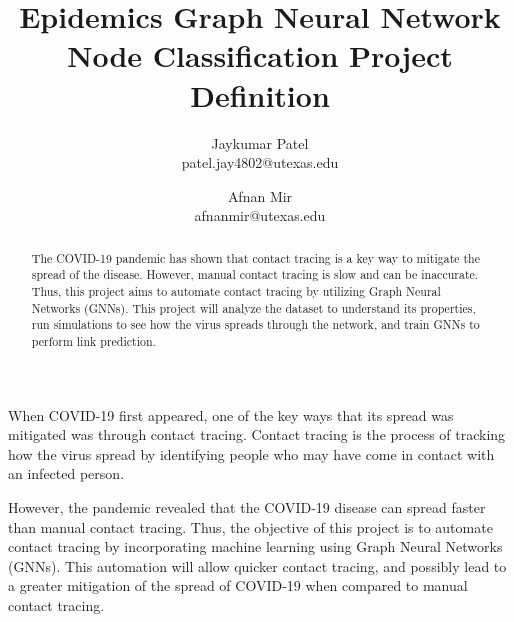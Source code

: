 \documentclass[times, 10pt,twocolumn]{article}
\begin{document}
\title{Epidemics Graph Neural Network Node Classification Project Definition}

\author{Jaykumar Patel\\
patel.jay4802@utexas.edu\\
\and
Afnan Mir\\
afnanmir@utexas.edu\\
}

\maketitle
\thispagestyle{empty}

\begin{abstract}
The COVID-19 pandemic has shown that contact tracing is a key way to mitigate the spread of the disease. However, manual contact tracing is slow and can be inaccurate. Thus, this project aims to automate contact tracing by utilizing Graph Neural Networks (GNNs). This project will analyze the dataset to understand its properties, run simulations to see how the virus spreads through the network, and train GNNs to perform link prediction.
\end{abstract}



When COVID-19 first appeared, one of the key ways that its spread was mitigated was through contact tracing. Contact tracing is the process of tracking how the virus spread by identifying people who may have come in contact with an infected person.

However, the pandemic revealed that the COVID-19 disease can spread faster than manual contact tracing. Thus, the objective of this project is to automate contact tracing by incorporating machine learning using Graph Neural Networks (GNNs). This automation will allow quicker contact tracing, and possibly lead to a greater mitigation of the spread of COVID-19 when compared to manual contact tracing.


\end{document}
